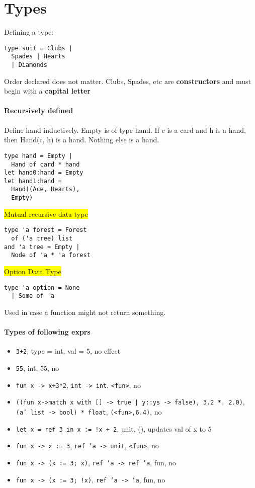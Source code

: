 \color{OliveGreen}
\section{Types}
Defining a type:
\begin{lstlisting}
type suit = Clubs |
  Spades | Hearts
  | Diamonds
\end{lstlisting}
Order declared does not matter. Clubs, Spades, etc are \textbf{constructors}
and must begin with a \textbf{capital letter}
\vspace{-1 em}
\paragraph{Recursively defined}
Define hand inductively. Empty is of type hand. If c is a card and h
is a hand, then Hand(c, h) is a hand. Nothing else is a hand.
\begin{lstlisting}
type hand = Empty |
  Hand of card * hand
let hand0:hand = Empty
let hand1:hand =
  Hand((Ace, Hearts),
  Empty)
\end{lstlisting}
\colorbox{Yellow}{Mutual recursive data type}
\begin{lstlisting}
type 'a forest = Forest
  of ('a tree) list
and 'a tree = Empty |
  Node of 'a * 'a forest
\end{lstlisting}
\colorbox{Yellow}{Option Data Type}
\begin{lstlisting}
type 'a option = None
  | Some of 'a
\end{lstlisting}
Used in case a function might not return something.
\vspace{-1 em}
\paragraph{Types of following exprs}
\begin{itemize}
  \setlength\itemsep{-0.5 em}
\item \texttt{3+2}, type = int, val = 5, no effect
\item \texttt{55}, int, 55, no
\item \texttt{fun x -> x+3*2}, \texttt{int -> int}, \texttt{<fun>},
  no
\item \texttt{((fun x->match x with [] -> true | y::ys -> false), 3.2
    *. 2.0)}, \texttt{(a' list -> bool) * float},
  \texttt{(<fun>,6.4)}, no
\item \texttt{let x = ref 3 in x := !x + 2},  unit, (), updates val of
  x to 5
\item \texttt{fun x -> x := 3}, \texttt{ref 'a -> unit},
  \texttt{<fun>}, no
\item \texttt{fun x -> (x := 3; x)}, \texttt{ref 'a -> ref 'a}, fun,
  no
\item \texttt{fun x -> (x := 3; !x)}, \texttt{ref 'a -> 'a}, fun, no
\end{itemize}

